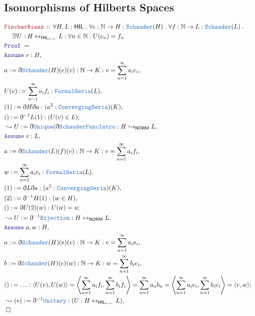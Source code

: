 \documentclass[12pt]{scrartcl}
\newcommand{\TYPE}[1]{\textcolor{NavyBlue}{\mathtt{#1}}}
\newcommand{\LOGIC}[1]{\textcolor{Blue}{\mathtt{#1}}}
\newcommand{\THM}[1]{\textcolor{Maroon}{\mathtt{#1}}}
\renewcommand{\.}{\; . \;}
\newcommand{\de}{: \kern 0.1pc =}
\newcommand{\Theorem}[2]{& \THM{#1} \, :: \, #2 \\ & \Proof = \\ }
\newcommand{\NewLine}{\\ & \kern 1pc}
\newcommand{\Page}[1]{\begin{align*} #1 \end{align*} \newpage   }
\newcommand{ \bd }{ \ByDef }
\newcommand{\Nat}{\mathbb{N} }
\newcommand{\ToInj}{\hookrightarrow}
\newcommand{\ToBij}{\leftrightarrow}
\newcommand{\Say}[3]{& #1 \de #2 : #3, \\}
\newcommand{\Conclude}[3]{& #1 \de #2 : #3; \\}
\newcommand{\Derive}[3]{& \leadsto #1 \de #2 : #3, \\}
\newcommand{\A}{\LOGIC{Assume} \;}
\newcommand{\Assume}[2]{& \A #1 : #2, \\}
\newcommand{\QED}{\; \square}
\newcommand{\EndProof}{& \QED \\}
\newcommand{\ByDef}{\eth}
\newcommand{\Proof}{\LOGIC{Proof} \; }
\newcommand{\NORM}{\textsf{NORM}}
\newcommand{\HIL}{\textsf{HIL}}
\newcommand{\HILI}{{\textsf{HIL}_{\circ \to \cdot}}}
\begin{document}
\subsection{ Isomorphisms of Hilberts Spaces}
\Page{
 \Theorem{FischerRiesz}{ \forall H, L : \HIL \.
 \forall e : \Nat \to H : \TYPE{Schauder}(H) \.
 \forall f : \Nat \to L : \TYPE{Schauder}(L) \. 
 \NewLine
 \exists ! U : H \ToBij_\HILI L  : \forall n \in \Nat \. U(e_n) = f_n 
 }
 \Assume{v}{H}
 \Say{a}{ \bd \TYPE{Schauder}(H)(e)(v)}{ \Nat \to K : v = \sum^\infty_{n = 1} a_i e_i }
 \Say{U(v)}{\sum^\infty_{n = 1} a_i f_i}{\TYPE{FormalSeria}(L)}
 \Say{(1)}{\bd H \bd a }{(a^2 : \TYPE{ConvergingSeria})(K)}
 \Conclude{()}{ \bd^{-1} L (1)  }{ (U(v) \in L)}
 \Derive{U}{\bd \TYPE{Unique}( \bd \TYPE{Schauder}\TYPE{FuncIntro}}{H \ToInj_\NORM L}
  \Assume{v}{L}
 \Say{a}{ \bd \TYPE{Schauder}(L)(f)(v)}{ \Nat \to K : v = \sum^\infty_{n = 1} a_i f_i }
 \Say{w}{\sum^\infty_{n = 1} a_i e_i}{\TYPE{FormalSeria}(L)}
 \Say{(1)}{\bd L \bd a }{(a^2 : \TYPE{ConvergingSeria})(K)}
 \Say{(2)}{ \bd^{-1} H (1)  }{ (w \in H)}
 \Conclude{()}{\bd U (2) (w) }{U(w) = u}
 \Derive{U}{\bd^{-1} \TYPE{Bijection}}{H \ToBij_\NORM L}
 \Assume{a,w}{H}
 \Say{a}{ \bd \TYPE{Schauder}(H)(e)(v)}{ \Nat \to K : v = \sum^\infty_{n = 1} a_i e_i }
 \Say{b}{ \bd \TYPE{Schauder}(H)(e)(w)}{ \Nat \to K : w = \sum^\infty_{n = 1} b_i e_i }
 \Conclude{()}{\ldots}{\langle U(v) , U(w) \rangle = \left\langle \sum^\infty_{n=1} a_i f_i, \sum^\infty_{n=1} b_i f_i \right\rangle = \sum^\infty_{n = 1} a_n b_n   = 
 \left\langle \sum^\infty_{n=1} a_i e_i, \sum^\infty_{n=1} b_i e_i \right\rangle
 = \langle v, w \rangle
 }
 \Derive{(*)}{ \bd^{-1} \TYPE{Unitary}}{ ( U : H \ToBij_{\HILI} L)}
 \EndProof
}
\end{document}
